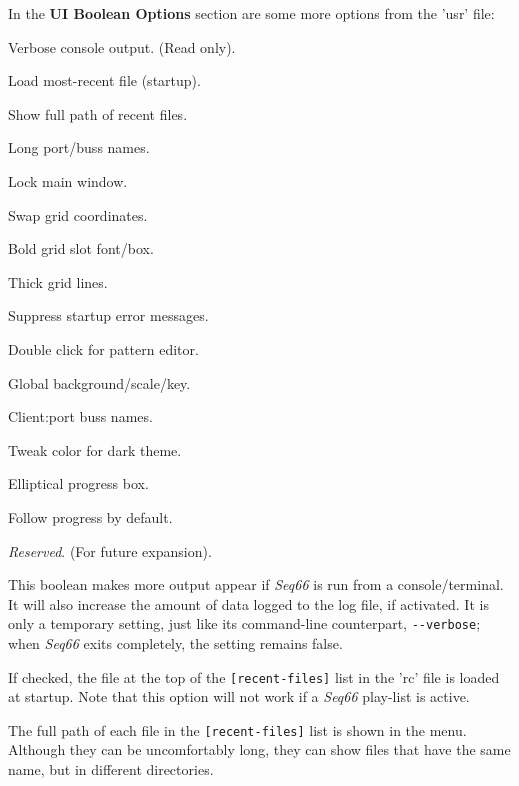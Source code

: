    In the \textbf{UI Boolean Options} section are some more options
   from the 'usr' file:

   \begin{enumber}
      \item Verbose console output. (Read only).
      \item Load most-recent file (startup).
      \item Show full path of recent files.
      \item Long port/buss names.
      \item Lock main window.
      \item Swap grid coordinates.
      \item Bold grid slot font/box.
      \item Thick grid lines.
      \item Suppress startup error messages.
      \item Double click for pattern editor.
      \item Global background/scale/key.
      \item Client:port buss names.
      \item Tweak color for dark theme.
      \item Elliptical progress box.
      \item Follow progress by default.
      \item \textsl{Reserved}. (For future expansion).
   \end{enumber}

   \setcounter{ItemCounter}{0}      %

   This boolean makes more output appear if \textsl{Seq66} is run from a
   console/terminal. It will also increase the amount of data logged to the log
   file, if activated. It is only a temporary setting, just like
   its command-line counterpart, \texttt{-{}-verbose}; when
   \textsl{Seq66} exits completely, the setting remains false.

   If checked, the file at the top of the \texttt{[recent-files]}
   list in the 'rc' file is loaded at startup.
   Note that this option will not work if a
   \textsl{Seq66} play-list is active.

   The full path of each file in the \texttt{[recent-files]} list
   is shown in the menu.  Although they can be uncomfortably long, they can
   show files that have the same name, but in different directories.

